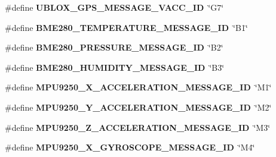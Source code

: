 \begin{DoxyCompactItemize}
\item 
\hypertarget{group___lo_ra_ga763dc8f791274e61c1d1e55ff00905fa}{}\#define {\bfseries U\+B\+L\+O\+X\+\_\+\+G\+P\+S\+\_\+\+M\+E\+S\+S\+A\+G\+E\+\_\+\+V\+A\+C\+C\+\_\+\+I\+D}~\char`\"{}G7\char`\"{}\label{group___lo_ra_ga763dc8f791274e61c1d1e55ff00905fa}

\item 
\hypertarget{group___lo_ra_ga6d8f40271de49f028df0878d44fdebe2}{}\#define {\bfseries B\+M\+E280\+\_\+\+T\+E\+M\+P\+E\+R\+A\+T\+U\+R\+E\+\_\+\+M\+E\+S\+S\+A\+G\+E\+\_\+\+I\+D}~\char`\"{}B1\char`\"{}\label{group___lo_ra_ga6d8f40271de49f028df0878d44fdebe2}

\item 
\hypertarget{group___lo_ra_gad74cd0174679392c72393b818af4d4ca}{}\#define {\bfseries B\+M\+E280\+\_\+\+P\+R\+E\+S\+S\+U\+R\+E\+\_\+\+M\+E\+S\+S\+A\+G\+E\+\_\+\+I\+D}~\char`\"{}B2\char`\"{}\label{group___lo_ra_gad74cd0174679392c72393b818af4d4ca}

\item 
\hypertarget{group___lo_ra_gab06679798246c277c65a8894dfb697d1}{}\#define {\bfseries B\+M\+E280\+\_\+\+H\+U\+M\+I\+D\+I\+T\+Y\+\_\+\+M\+E\+S\+S\+A\+G\+E\+\_\+\+I\+D}~\char`\"{}B3\char`\"{}\label{group___lo_ra_gab06679798246c277c65a8894dfb697d1}

\item 
\hypertarget{group___lo_ra_gab5bccf8e8b0ced027261e75aba0866f0}{}\#define {\bfseries M\+P\+U9250\+\_\+\+X\+\_\+\+A\+C\+C\+E\+L\+E\+R\+A\+T\+I\+O\+N\+\_\+\+M\+E\+S\+S\+A\+G\+E\+\_\+\+I\+D}~\char`\"{}M1\char`\"{}\label{group___lo_ra_gab5bccf8e8b0ced027261e75aba0866f0}

\item 
\hypertarget{group___lo_ra_ga305968791b55acf2450470070d23831b}{}\#define {\bfseries M\+P\+U9250\+\_\+\+Y\+\_\+\+A\+C\+C\+E\+L\+E\+R\+A\+T\+I\+O\+N\+\_\+\+M\+E\+S\+S\+A\+G\+E\+\_\+\+I\+D}~\char`\"{}M2\char`\"{}\label{group___lo_ra_ga305968791b55acf2450470070d23831b}

\item 
\hypertarget{group___lo_ra_gab80a1195f30b3d3355989b1cadda7eab}{}\#define {\bfseries M\+P\+U9250\+\_\+\+Z\+\_\+\+A\+C\+C\+E\+L\+E\+R\+A\+T\+I\+O\+N\+\_\+\+M\+E\+S\+S\+A\+G\+E\+\_\+\+I\+D}~\char`\"{}M3\char`\"{}\label{group___lo_ra_gab80a1195f30b3d3355989b1cadda7eab}

\item 
\hypertarget{group___lo_ra_ga5833e711a700c4602efa3439acda3141}{}\#define {\bfseries M\+P\+U9250\+\_\+\+X\+\_\+\+G\+Y\+R\+O\+S\+C\+O\+P\+E\+\_\+\+M\+E\+S\+S\+A\+G\+E\+\_\+\+I\+D}~\char`\"{}M4\char`\"{}\label{group___lo_ra_ga5833e711a700c4602efa3439acda3141}


\end{DoxyCompactItemize}
